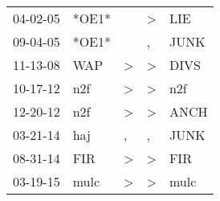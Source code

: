 \begin{supertabular}{lllll}
 04-02-05 &  *OE1* &                  &     \textgreater &    LIE \\
 09-04-05 &  *OE1* &                  &                , &   JUNK \\
 11-13-08 &    WAP &     \textgreater &     \textgreater &   DIVS \\
 10-17-12 &    n2f &     \textgreater &     \textgreater &    n2f \\
 12-20-12 &    n2f &     \textgreater &     \textgreater &   ANCH \\
 03-21-14 &    haj &                , &                , &   JUNK \\
 08-31-14 &    FIR &     \textgreater &     \textgreater &    FIR \\
 03-19-15 &   mulc &     \textgreater &     \textgreater &   mulc \\
\end{supertabular}
